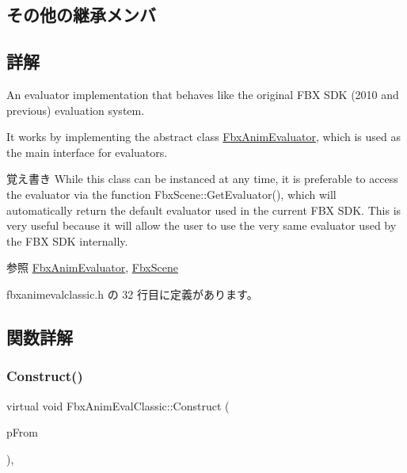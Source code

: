\subsection*{その他の継承メンバ}


\subsection{詳解}
An evaluator implementation that behaves like the original F\+BX S\+DK (2010 and previous) evaluation system.

It works by implementing the abstract class \hyperlink{class_fbx_anim_evaluator}{Fbx\+Anim\+Evaluator}, which is used as the main interface for evaluators. \begin{DoxyNote}{覚え書き}
While this class can be instanced at any time, it is preferable to access the evaluator via the function Fbx\+Scene\+::\+Get\+Evaluator(), which will automatically return the default evaluator used in the current F\+BX S\+DK. This is very useful because it will allow the user to use the very same evaluator used by the F\+BX S\+DK internally. 
\end{DoxyNote}
\begin{DoxySeeAlso}{参照}
\hyperlink{class_fbx_anim_evaluator}{Fbx\+Anim\+Evaluator}, \hyperlink{class_fbx_scene}{Fbx\+Scene} 
\end{DoxySeeAlso}


 fbxanimevalclassic.\+h の 32 行目に定義があります。



\subsection{関数詳解}
\mbox{\label{class_fbx_anim_eval_classic_a9b0ca916c170485271aa2ba23d38019a}} 
\subsubsection{\texorpdfstring{Construct()}{Construct()}}
{\footnotesize\ttfamily virtual void Fbx\+Anim\+Eval\+Classic\+::\+Construct (\begin{DoxyParamCaption}\item[{const \hyperlink{class_fbx_object}{Fbx\+Object} $\ast$}]{p\+From }\end{DoxyParamCaption})\hspace{0.3cm}{\ttfamily [protected]}, {\ttfamily [virtual]}}

